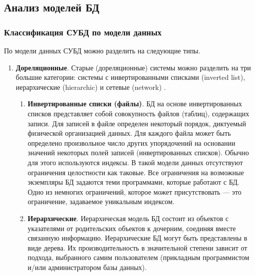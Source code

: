 \clearpage



\subsection{Анализ моделей БД}

\subsubsection{Классификация СУБД по модели данных}

По модели данных СУБД можно разделить на следующие типы.

\begin{enumerate}[label*=\arabic*.]
	\item \textbf{Дореляционные}. \newline
	Старые (дореляционные) системы можно разделить на три большие категории: системы с инвертированными списками (inverted list), иерархические (hierarchic) и сетевые (network) \cite{Date_old}. 
	
		
	\begin{enumerate}[label*=\arabic*.]
		\item \textbf{Инвертированные списки (файлы)}. \newline
		БД на основе инвертированных списков представляет собой совокупность файлов (таблиц), содержащих записи. Для записей в файле определен некоторый порядок, диктуемый физической организацией данных. Для каждого файла может быть определено произвольное число других упорядочений на основании значений некоторых полей записей (инвертированных списков). Обычно для этого используются индексы. В такой модели данных отсутствуют ограничения целостности как таковые. Все ограничения на возможные экземпляры БД задаются теми программами, которые работают с БД. Одно из немногих ограничений, которое может присутствовать --- это ограничение, задаваемое уникальным индексом. 
		
		\item \textbf{Иерархические}. \newline
		Иерархическая модель БД состоит из объектов с указателями от родительских объектов к дочерним, соединяя вместе связанную информацию. Иерархические БД могут быть представлены в виде дерева. Их производительность в значительной степени зависит от подхода, выбранного самим пользователем (прикладным программистом и/или администратором базы данных).
		

\end{enumerate}
\end{enumerate}

